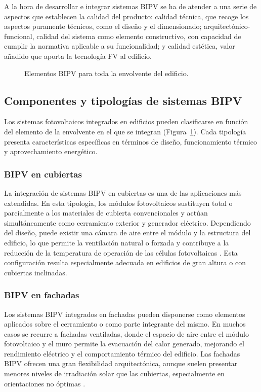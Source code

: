 A la hora de desarrollar e integrar sistemas BIPV se ha de atender a una serie de aspectos que establecen la calidad del producto: calidad técnica, que recoge los aspectos puramente técnicos, como el diseño y el dimensionado; arquitectónico-funcional, calidad del sistema como elemento constructivo, con capacidad de cumplir la normativa aplicable a su funcionalidad; y calidad estética, valor añadido que aporta la tecnología FV al edificio.   

\begin{figure}
	\centering
	
	\caption{Elementos BIPV para toda la envolvente del edificio.}
	\label{fig:elementosbipc}
\end{figure}
\subsection{Componentes y tipologías de sistemas BIPV}

Los sistemas fotovoltaicos integrados en edificios pueden clasificarse en función del elemento de la envolvente en el que se integran (Figura~\ref{fig:elementosbipc}). Cada tipología presenta características específicas en términos de diseño, funcionamiento térmico y aprovechamiento energético.

\subsubsection{BIPV en cubiertas}

La integración de sistemas BIPV en cubiertas es una de las aplicaciones más extendidas. En esta tipología, los módulos fotovoltaicos sustituyen total o parcialmente a los materiales de cubierta convencionales y actúan simultáneamente como cerramiento exterior y generador eléctrico. Dependiendo del diseño, puede existir una cámara de aire entre el módulo y la estructura del edificio, lo que permite la ventilación natural o forzada y contribuye a la reducción de la temperatura de operación de las células fotovoltaicas \cite{Baljit2016}. Esta configuración resulta especialmente adecuada en edificios de gran altura o con cubiertas inclinadas.

\subsubsection{BIPV en fachadas}

Los sistemas BIPV integrados en fachadas pueden disponerse como elementos aplicados sobre el cerramiento o como parte integrante del mismo. En muchos casos se recurre a fachadas ventiladas, donde el espacio de aire entre el módulo fotovoltaico y el muro permite la evacuación del calor generado, mejorando el rendimiento eléctrico y el comportamiento térmico del edificio. Las fachadas BIPV ofrecen una gran flexibilidad arquitectónica, aunque suelen presentar menores niveles de irradiación solar que las cubiertas, especialmente en orientaciones no óptimas \cite{Baljit2016}.

